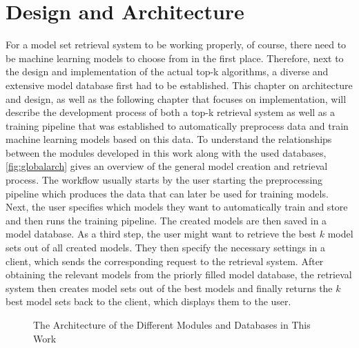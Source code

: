 \chapter{Design and Architecture} \label{chap:design}

For a model set retrieval system to be working properly, of course, there need to be machine learning models to choose from in the first place. Therefore, next to the design and implementation of the actual top-k algorithms, a diverse and extensive model database first had to be established. This chapter on architecture and design, as well as the following chapter that focuses on implementation, will describe the development process of both a top-k retrieval system as well as a training pipeline that was established to automatically preprocess data and train machine learning models based on this data. To understand the relationships between the modules developed in this work along with the used databases, \autoref{fig:globalarch} gives an overview of the general model creation and retrieval process. The workflow usually starts by the user starting the preprocessing pipeline which produces the data that can later be used for training models. Next, the user specifies which models they want to automatically train and store and then runs the training pipeline. The created models are then saved in a model database. As a third step, the user might want to retrieve the best $k$ model sets out of all created models. They then specify the necessary settings in a client, which sends the corresponding request to the retrieval system. After obtaining the relevant models from the priorly filled model database, the retrieval system then creates model sets out of the best models and finally returns the $k$ best model sets back to the client, which displays them to the user.

\begin{figure}[htbp]

  \caption{The Architecture of the Different Modules and Databases in This Work}
  \label{fig:globalarch}
\end{figure}

